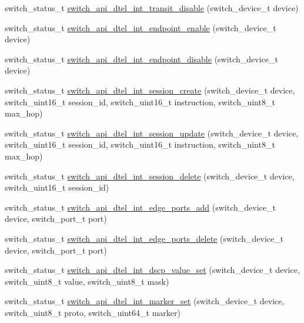 \begin{DoxyCompactItemize}
\item 
switch\+\_\+status\+\_\+t \hyperlink{group__DTel_ga88df300edb4681741703b0d25a88565b}{switch\+\_\+api\+\_\+dtel\+\_\+int\+\_\+transit\+\_\+disable} (switch\+\_\+device\+\_\+t device)
\item 
switch\+\_\+status\+\_\+t \hyperlink{group__DTel_gad48747c6970899f535cfd33fa6080daa}{switch\+\_\+api\+\_\+dtel\+\_\+int\+\_\+endpoint\+\_\+enable} (switch\+\_\+device\+\_\+t device)
\item 
switch\+\_\+status\+\_\+t \hyperlink{group__DTel_ga34595b6ebecb406575b4b7cae67d0b81}{switch\+\_\+api\+\_\+dtel\+\_\+int\+\_\+endpoint\+\_\+disable} (switch\+\_\+device\+\_\+t device)
\item 
switch\+\_\+status\+\_\+t \hyperlink{group__DTel_gaa839fa9023c0d216bf8f5a34dd56e944}{switch\+\_\+api\+\_\+dtel\+\_\+int\+\_\+session\+\_\+create} (switch\+\_\+device\+\_\+t device, switch\+\_\+uint16\+\_\+t session\+\_\+id, switch\+\_\+uint16\+\_\+t instruction, switch\+\_\+uint8\+\_\+t max\+\_\+hop)
\item 
switch\+\_\+status\+\_\+t \hyperlink{group__DTel_ga118ca42d32fde8d105a7f584d7aa9c33}{switch\+\_\+api\+\_\+dtel\+\_\+int\+\_\+session\+\_\+update} (switch\+\_\+device\+\_\+t device, switch\+\_\+uint16\+\_\+t session\+\_\+id, switch\+\_\+uint16\+\_\+t instruction, switch\+\_\+uint8\+\_\+t max\+\_\+hop)
\item 
switch\+\_\+status\+\_\+t \hyperlink{group__DTel_ga822c8e14729e0629fc29c6543a4804d3}{switch\+\_\+api\+\_\+dtel\+\_\+int\+\_\+session\+\_\+delete} (switch\+\_\+device\+\_\+t device, switch\+\_\+uint16\+\_\+t session\+\_\+id)
\item 
switch\+\_\+status\+\_\+t \hyperlink{group__DTel_ga317e2d2c923118e7d3ff6eb8132d9142}{switch\+\_\+api\+\_\+dtel\+\_\+int\+\_\+edge\+\_\+ports\+\_\+add} (switch\+\_\+device\+\_\+t device, switch\+\_\+port\+\_\+t port)
\item 
switch\+\_\+status\+\_\+t \hyperlink{group__DTel_gaca72fbe934b2cd6b2ddf37727628b427}{switch\+\_\+api\+\_\+dtel\+\_\+int\+\_\+edge\+\_\+ports\+\_\+delete} (switch\+\_\+device\+\_\+t device, switch\+\_\+port\+\_\+t port)
\item 
switch\+\_\+status\+\_\+t \hyperlink{group__DTel_gad370f6d65b929b53ee9dd7345459237f}{switch\+\_\+api\+\_\+dtel\+\_\+int\+\_\+dscp\+\_\+value\+\_\+set} (switch\+\_\+device\+\_\+t device, switch\+\_\+uint8\+\_\+t value, switch\+\_\+uint8\+\_\+t mask)
\item 
switch\+\_\+status\+\_\+t \hyperlink{group__DTel_gaf3ae2403716d88828eb96fbbf581d612}{switch\+\_\+api\+\_\+dtel\+\_\+int\+\_\+marker\+\_\+set} (switch\+\_\+device\+\_\+t device, switch\+\_\+uint8\+\_\+t proto, switch\+\_\+uint64\+\_\+t marker)

\end{DoxyCompactItemize}
